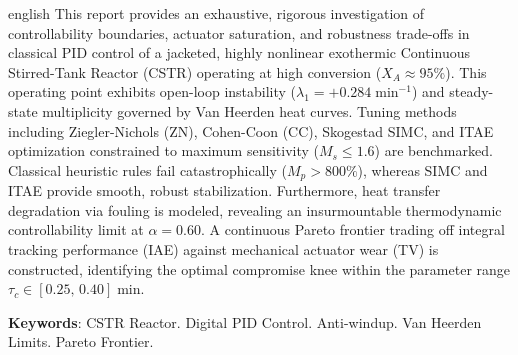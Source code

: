 \documentclass[
	12pt,
	oneside,
	a4paper,
	chapter=TITLE,
	section=TITLE,
	english,
	brazilian
]{abntex2}
\begin{document}
\begin{resumo}[Abstract]
\begin{otherlanguage*}{english}
This report provides an exhaustive, rigorous investigation of controllability boundaries, actuator saturation, and robustness trade-offs in classical PID control of a jacketed, highly nonlinear exothermic Continuous Stirred-Tank Reactor (CSTR) operating at high conversion ($X_A \approx 95\%$). This operating point exhibits open-loop instability ($\lambda_1 = +0.284\;\si{\minute^{-1}}$) and steady-state multiplicity governed by Van Heerden heat curves. Tuning methods including Ziegler-Nichols (ZN), Cohen-Coon (CC), Skogestad SIMC, and ITAE optimization constrained to maximum sensitivity ($M_s \leq 1.6$) are benchmarked. Classical heuristic rules fail catastrophically ($M_p > 800\%$), whereas SIMC and ITAE provide smooth, robust stabilization. Furthermore, heat transfer degradation via fouling is modeled, revealing an insurmountable thermodynamic controllability limit at $\alpha = 0.60$. A continuous Pareto frontier trading off integral tracking performance (IAE) against mechanical actuator wear (TV) is constructed, identifying the optimal compromise knee within the parameter range $\tau_c \in [0.25,\, 0.40]\;\si{\minute}$.

\vspace{\onelineskip}
\noindent
\textbf{Keywords}: CSTR Reactor. Digital PID Control. Anti-windup. Van Heerden Limits. Pareto Frontier.
\end{otherlanguage*}
\end{resumo}

\listoffigures*
\cleardoublepage

\listoftables*
\cleardoublepage
\end{document}
